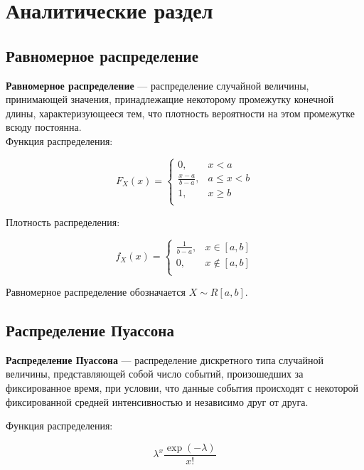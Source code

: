 \section{Аналитические раздел}

\subsection{Равномерное распределение}

\textbf{Равномерное распределение} --- 
распределение случайной величины, принимающей значения, принадлежащие некоторому промежутку конечной длины, 
характеризующееся тем, что плотность вероятности на этом промежутке всюду постоянна.\\

Функция распределения:

\begin{equation*}
	F_X (x) =
	\begin{cases}
		0,& x < a \\
		\frac{x - a}{b - a},& a \le x < b \\
		1,& x \geq b \\
	\end{cases}
\end{equation*}


Плотность распределения:

\begin{equation*}
	f_X (x) =
	\begin{cases}
		\frac{1}{b-a},& x \in [a,b] \\
		0,& x \notin [a, b] \\
	\end{cases}
\end{equation*}

Равномерное распределение обозначается $X \sim R[a, b]$.

\subsection{Распределение Пуассона}

\textbf{Распределение Пуассона} --- 
распределение дискретного типа случайной величины, представляющей собой число событий, 
произошедших за фиксированное время, при условии, 
что данные события происходят с некоторой фиксированной средней интенсивностью и независимо друг от друга.

Функция распределения:

\begin{equation*}
    \lambda^x \frac{\exp(-\lambda)}{x !}
\end{equation*}

